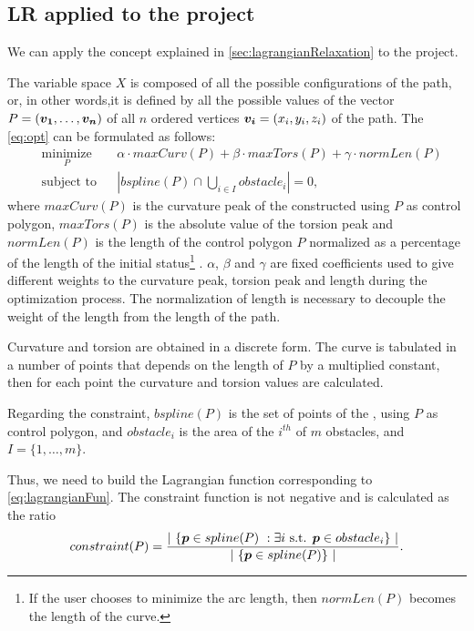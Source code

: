 \documentclass[dissertation.tex]{subfiles}
\begin{document}
\subsection{\acf{LR} applied to the project}
We can apply the concept explained in \cref{sec:lagrangianRelaxation}
to the project.

The variable space $X$ is composed of all the possible
configurations of the path, or, in other words,it is defined by all
the possible values of the vector $P=(\boldsymbol{v_1},\dots,\boldsymbol{v_n})$ of all
$n$ ordered 
vertices $\boldsymbol{v_i}=(x_i,y_i,z_i)$ of the
path. The \cref{eq:opt} can be formulated as follows:
\begin{equation*}
  \begin{aligned}
    & \underset{P}{\text{minimize}}
    & & \alpha\cdot maxCurv(P)+\beta\cdot
    maxTors(P)+\gamma\cdot normLen(P) \\
    & \text{subject to}
    & & \left|bspline(P)\cap \bigcup_{i\in I}obstacle_i\right| = 0,
  \end{aligned}
\end{equation*}
where $maxCurv(P)$ is the curvature peak of the \bs
constructed using $P$ as control polygon,
$maxTors(P)$ is the absolute value of the torsion peak and
$normLen(P)$ is the length of the control polygon
$P$ normalized as a percentage of the length of the initial
status\footnote{If the user chooses to minimize the
  arc length, then $normLen(P)$ becomes the length of the \bs curve.}
. $\alpha$, $\beta$ and $\gamma$ are fixed
coefficients used to give different weights to 
the curvature peak, torsion peak and length during the optimization
process. The normalization of
length is necessary to decouple the weight of the length from the
length of the path.

Curvature and torsion are obtained in a discrete form. The \bs curve is
tabulated in a number of points that depends on the length of $P$
by a multiplied constant, then for each point the curvature and
torsion values 
are calculated.

Regarding the constraint, $bspline(P)$
is the set of points of the \emph{\bs}, using $P$ as 
control polygon, and 
$obstacle_i$ is the area of the $i^{th}$ of $m$ obstacles, and
$I=\{1,\dots,m\}$.

Thus, we need to build the Lagrangian function corresponding to
\cref{eq:lagrangianFun}.
The constraint function is not negative and is calculated as the
ratio
\begin{equation}\label{eq:constraintLag}
constraint(P) = \frac{\left|\ \{\boldsymbol{p} \in spline(P)\ : \exists i
    \text{ s.t. } \boldsymbol{p}\in
    obstacle_i\}\ \right|}{\left|\ \{\boldsymbol{p} \in
    spline(P)\}\ \right|}.
\end{equation}
\end{document}
